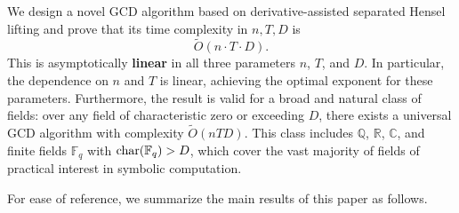 \documentclass{article}
\numberwithin{equation}{section}
\begin{document}
We design a novel GCD algorithm based on derivative-assisted separated Hensel lifting and prove that its time complexity in $n, T, D$ is
\[
\widetilde{O}(n \cdot T \cdot D).
\]
This is asymptotically \textbf{linear} in all three parameters $n$, $T$, and $D$. In particular, the dependence on $n$ and $T$ is linear, achieving the optimal exponent for these parameters.
Furthermore, the result is valid for a broad and natural class of fields: over any field of characteristic zero or exceeding $D$, there exists a universal GCD algorithm with complexity $\widetilde{O}(nTD)$. This class includes $\mathbb{Q}$, $\mathbb{R}$, $\mathbb{C}$, and finite fields $\mathbb{F}_q$ with $\operatorname{char}({\mathbb {F}}_q) > D$, which cover the vast majority of fields of practical interest in symbolic computation.




For ease of reference, we summarize the main results of this paper as follows.
\end{document}
